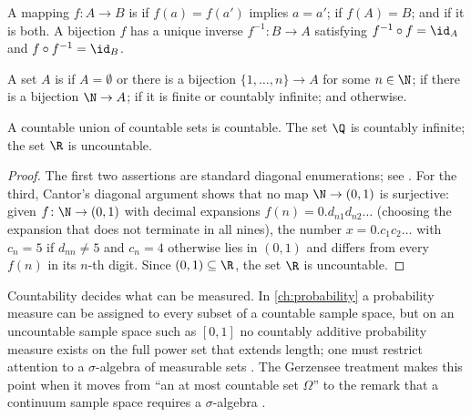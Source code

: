 \begin{definition}\label{def:inj-surj}
	A mapping $f\colon A\to B$ is
	 if $f(a)=f(a')$ implies $a=a'$;
	 if $f(A)=B$; and
	 if it is both. A bijection $f$ has a
	unique inverse $f^{-1}\colon B\to A$ satisfying $f^{-1}\circ f=\id_A$ and
	$f\circ f^{-1}=\id_B$.
\end{definition}

\begin{definition}\label{def:countable}
	A set $A$ is  if $A=\emptyset$ or there is a bijection
	$\{1,\dots,n\}\to A$ for some $n\in\N$;  if there is a bijection $\N\to A$;  if it is finite
	or countably infinite; and  otherwise.
\end{definition}

\begin{proposition}\label{prop:countable-union}
	A countable union of countable sets is countable. The set $\Q$ is countably
	infinite; the set $\R$ is uncountable.
\end{proposition}

\begin{proof}
	The first two assertions are standard diagonal enumerations; see
	\textcite[Thm.~2.12 and its corollary]{rudin1976principles}. For the third,
	Cantor's diagonal argument shows that no map $\N\to(0,1)$ is surjective: given
	$f\colon\N\to(0,1)$ with decimal expansions $f(n)=0.d_{n1}d_{n2}\dots$ (choosing
	the expansion that does not terminate in all nines), the number
	$x=0.c_1c_2\dots$ with $c_n=5$ if $d_{nn}\neq5$ and $c_n=4$ otherwise lies in
	$(0,1)$ and differs from every $f(n)$ in its $n$-th digit. Since
	$(0,1)\subseteq\R$, the set $\R$ is uncountable.
\end{proof}

\begin{remark}\label{rem:countability-econ}
	Countability decides what can be measured. In \autoref{ch:probability} a probability
	measure can be assigned to every subset of a countable sample space, but on an
	uncountable sample space such as $[0,1]$ no countably additive probability
	measure exists on the full power set that extends length; one must restrict
	attention to a $\sigma$-algebra of measurable sets
	\autocite[Ch.~1]{legall2022measure}. The Gerzensee treatment makes this
	point when it moves from ``an at most countable set $\Omega$''
	\autocite[slide 3]{fukuda2026probability} to the remark that a continuum
	sample space requires a $\sigma$-algebra
	\autocite[slide 37]{fukuda2026analysis}.
\end{remark}


